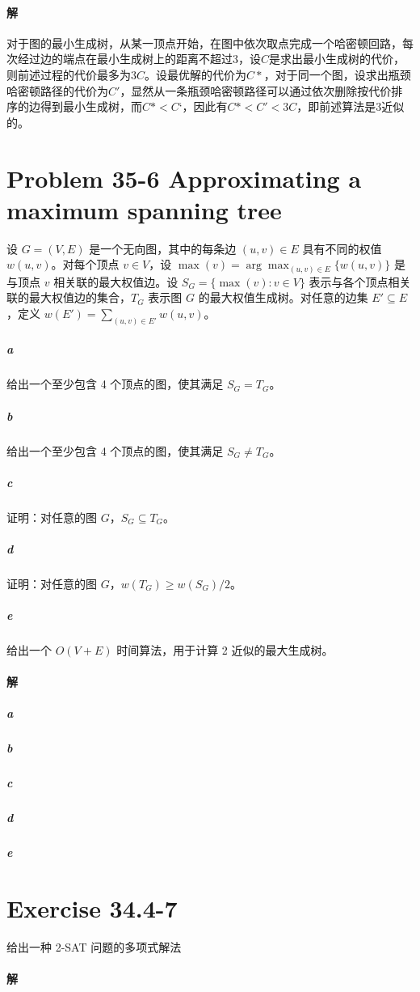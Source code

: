 \documentclass{article}
\begin{document}
\paragraph{解}
对于图的最小生成树，从某一顶点开始，在图中依次取点完成一个哈密顿回路，每次经过边的端点在最小生成树上的距离不超过3，设$C$是求出最小生成树的代价，则前述过程的代价最多为$3C$。设最优解的代价为$C*$，对于同一个图，设求出瓶颈哈密顿路径的代价为$C'$，显然从一条瓶颈哈密顿路径可以通过依次删除按代价排序的边得到最小生成树，而$C* < C‘$，因此有$C* < C' < 3C$，即前述算法是3近似的。

\section{Problem 35-6 Approximating a maximum spanning tree}
设 $G = (V, E)$ 是一个无向图，其中的每条边 $(u, v) \in E$ 具有不同的权值 $w(u,v)$。对每个顶点 $v \in V$，设 $\max{(v)} = \displaystyle \arg{\max_{(u,v) \in E}{\{ w(u, v) \}}}$ 是与顶点 $v$ 相关联的最大权值边。设 $S_G = \{ \max{(v)} : v \in V\} $ 表示与各个顶点相关联的最大权值边的集合，$T_G$ 表示图 $G$ 的最大权值生成树。对任意的边集 $E' \subseteq E$，定义 $w(E') = \displaystyle \sum_{(u,v) \in E'}{w(u,v)}$。
\subparagraph{a} 给出一个至少包含 4 个顶点的图，使其满足 $S_G = T_G$。
\subparagraph{b} 给出一个至少包含 4 个顶点的图，使其满足 $S_G \neq T_G$。
\subparagraph{c} 证明：对任意的图 $G$，$S_G \subseteq T_G$。
\subparagraph{d} 证明：对任意的图 $G$，$w(T_G) \geq w(S_G) / 2$。
\subparagraph{e} 给出一个 $O(V + E)$ 时间算法，用于计算 2 近似的最大生成树。


\paragraph{解}
\subparagraph{a}
\begin{figure}[H]
    \centering
\end{figure}
\subparagraph{b}
\subparagraph{c}
\subparagraph{d}
\subparagraph{e}

\section{Exercise 34.4-7}
给出一种 2-SAT 问题的多项式解法
\paragraph{解}
\end{document}
